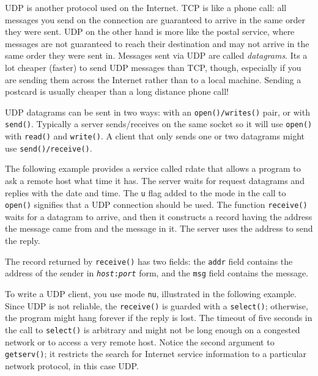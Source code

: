 UDP is another protocol used on the Internet. TCP is like a
phone call: all messages you send on the connection are guaranteed to
arrive in the same order they were sent. UDP on the other hand is more
like the postal service, where messages are not guaranteed to reach
their destination and may not arrive in the same order they were sent
in. Messages sent via UDP are called \textit{datagrams}.
It{\textquotesingle}s a lot cheaper (faster) to send UDP messages than
TCP, though, especially if you are sending them across the Internet
rather than to a local machine. Sending a postcard is usually cheaper
than a long distance phone call!

UDP datagrams can be sent in two ways: with an \texttt{open()/writes()}
pair, or with \texttt{send()}. Typically a server sends/receives on the
same socket so it will use \texttt{open()} with \texttt{read()} and
\texttt{write()}. A client that only sends one or two datagrams might
use
\texttt{send()}\texttt{/}\texttt{receive()}.

The following example provides a service called
{\textquotedbl}rdate{\textquotedbl} that allows a program to ask a
remote host what time it has. The server waits for request datagrams
and replies with the date and time. The
\texttt{{\textquotedbl}u{\textquotedbl}} flag added to the mode in the
call to \texttt{open()} signifies that a UDP connection should be used.
The function \texttt{receive()} waits for a datagram to arrive, and
then it constructs a record having the address the message came from
and the message in it. The server uses the address to send the reply.


The record returned by \texttt{receive()} has two fields: the
\texttt{addr} field contains the address of the sender in
\texttt{{\textquotedbl}}\texttt{\textit{host}}\texttt{:}\texttt{\textit{port}}\texttt{{\textquotedbl}}
form, and the \texttt{msg} field contains the message.

To write a UDP client, you use mode
\texttt{{\textquotedbl}nu{\textquotedbl}}, illustrated in the following
example. Since UDP is not reliable, the \texttt{receive()} is guarded
with a \texttt{select()}; otherwise, the program might hang forever if
the reply is lost. The timeout of five seconds in the call to
\texttt{select()} is arbitrary and might not be long enough on a
congested network or to access a very remote host. Notice the second
argument to \texttt{getserv()}; it restricts the search for Internet
service information to a particular network protocol, in this case UDP.

